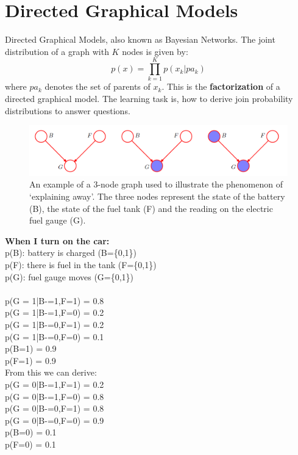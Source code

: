 \documentclass{article}
\begin{document}
\section{Directed Graphical Models}
Directed Graphical Models, also known as Bayesian Networks. The joint distribution of a graph with $K$ nodes is given by:
\begin{equation}
    p(x) = \prod_{k=1}^K p(x_k|pa_k)
\end{equation}
where $pa_k$ denotes the set of parents of $x_k$. This is the \textbf{factorization} of a directed graphical model. The learning task is, how to derive join probability distributions to answer questions.

\begin{figure}[tb]
 \centering 
\includegraphics[scale=0.42]{images/DGM.png} 
 \caption{An example of a 3-node graph used to illustrate the phenomenon of ‘explaining away’. The three
nodes represent the state of the battery (B), the state of the fuel tank (F) and the reading on the electric fuel
gauge (G).}
 \label{fig:GDM}
\end{figure}
\textbf{When I turn on the car:} \\
p(B): battery is charged (B=\{0,1\})\\
p(F): there is fuel in the tank (F=\{0,1\})\\
p(G): fuel gauge moves (G=\{0,1\})\\
\\
p(G = 1|B-=1,F=1) = 0.8 \\
p(G = 1|B-=1,F=0) = 0.2 \\
p(G = 1|B-=0,F=1) = 0.2 \\
p(G = 1|B-=0,F=0) = 0.1 \\
p(B=1) = 0.9 \\
p(F=1) = 0.9 \\
From this we can derive: \\
p(G = 0|B-=1,F=1) = 0.2 \\
p(G = 0|B-=1,F=0) = 0.8 \\
p(G = 0|B-=0,F=1) = 0.8 \\
p(G = 0|B-=0,F=0) = 0.9 \\
p(B=0) = 0.1 \\
p(F=0) = 0.1 \\
\end{document}
